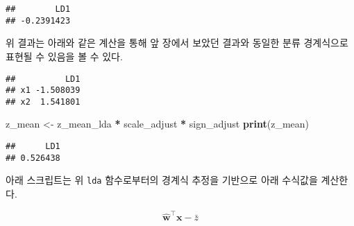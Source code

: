 \documentclass[]{book}
\newenvironment{Shaded}{\begin{snugshade}}{\end{snugshade}}
\newcommand{\DecValTok}[1]{\textcolor[rgb]{0.00,0.00,0.81}{#1}}
\newcommand{\KeywordTok}[1]{\textcolor[rgb]{0.13,0.29,0.53}{\textbf{#1}}}
\newcommand{\NormalTok}[1]{#1}
\newcommand{\OperatorTok}[1]{\textcolor[rgb]{0.81,0.36,0.00}{\textbf{#1}}}
\newcommand{\StringTok}[1]{\textcolor[rgb]{0.31,0.60,0.02}{#1}}
\begin{document}
\begin{verbatim}
##        LD1 
## -0.2391423
\end{verbatim}

위 결과는 아래와 같은 계산을 통해 앞 장에서 보았던 결과와 동일한 분류 경계식으로 표현될 수 있음을 볼 수 있다.

\begin{Shaded}
\end{Shaded}

\begin{verbatim}
##          LD1
## x1 -1.508039
## x2  1.541801
\end{verbatim}

\begin{Shaded}
\begin{Highlighting}[]
\NormalTok{z_mean <-}\StringTok{ }\NormalTok{z_mean_lda }\OperatorTok{*}\StringTok{ }\NormalTok{scale_adjust }\OperatorTok{*}\StringTok{ }\NormalTok{sign_adjust }
\KeywordTok{print}\NormalTok{(z_mean)}
\end{Highlighting}
\end{Shaded}

\begin{verbatim}
##      LD1 
## 0.526438
\end{verbatim}

아래 스크립트는 위 \texttt{lda} 함수로부터의 경계식 추정을 기반으로 아래 수식값을 계산한다.

\begin{equation*}
\hat{\mathbf{w}}^\top \mathbf{x} - \bar{z}
\end{equation*}

\begin{Shaded}
\end{Shaded}
\end{document}
